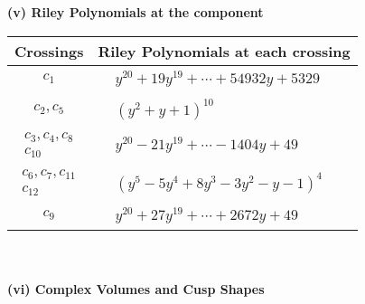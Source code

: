 \documentclass[1p]{elsarticle_modified}
\theoremstyle{definition}
\begin{document}
\newpage\renewcommand{\arraystretch}{1}
\flushleft \textbf{(v) Riley Polynomials at the component}\newline \\
\begin{tabular}{m{50pt}|m{274pt}}
Crossings & \hspace{64pt}Riley Polynomials at each crossing \\
\hline $$\begin{aligned}c_{1}\end{aligned}$$&$\begin{aligned}
&y^{20}+19 y^{19}+\cdots+54932 y+5329
\end{aligned}$\\
\hline $$\begin{aligned}c_{2},c_{5}\end{aligned}$$&$\begin{aligned}
&(y^2+y+1)^{10}
\end{aligned}$\\
\hline $$\begin{aligned}c_{3},c_{4},c_{8}\\c_{10}\end{aligned}$$&$\begin{aligned}
&y^{20}-21 y^{19}+\cdots-1404 y+49
\end{aligned}$\\
\hline $$\begin{aligned}c_{6},c_{7},c_{11}\\c_{12}\end{aligned}$$&$\begin{aligned}
&(y^5-5 y^4+8 y^3-3 y^2- y-1)^4
\end{aligned}$\\
\hline $$\begin{aligned}c_{9}\end{aligned}$$&$\begin{aligned}
&y^{20}+27 y^{19}+\cdots+2672 y+49
\end{aligned}$\\
\hline
\end{tabular}\\~\\
\newpage\flushleft \textbf{(vi) Complex Volumes and Cusp Shapes}
\end{document}
